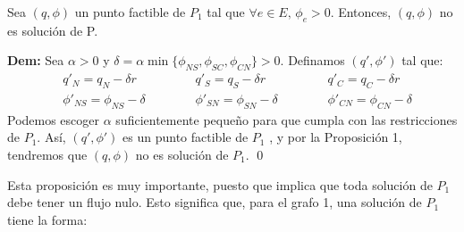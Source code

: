 \documentclass[12pt,twoside]{article}
\newenvironment{proposicion}[2][\(\blacksquare\) Proposici\'on]{\begin{trivlist}
		\item[\hskip \labelsep {\bfseries #1}\hskip \labelsep {\bfseries #2.}]}{\end{trivlist}}
\begin{document}
	\begin{proposicion}{3} Sea \((q,\phi)\) un punto factible de \(P_1\) tal que \(\forall e \in E,\, \phi_e>0\). Entonces, \((q,\phi)\) no es soluci\'on de P.
		
		\textbf{Dem:} Sea \(\alpha>0\) y \(\delta=\alpha\min\{\phi_{NS},\phi_{SC},\phi_{CN}\}>0\). Definamos \((q',\phi')\) tal que:
		\begin{equation*}
			\begin{aligned}
				&  q'_N=q_N-\delta r  & \hspace{1cm} &  q'_S=q_S-\delta r & \hspace{1cm} &  q'_C=q_C-\delta r \\
				& \phi'_{NS}=\phi_{NS}-\delta & \hspace{1cm} & \phi'_{SN}=\phi_{SN}-\delta & \hspace{1cm} & \phi'_{CN}=\phi_{CN}-\delta
			\end{aligned}
		\end{equation*}
		Podemos escoger \(\alpha\) suficientemente peque\~{n}o para que cumpla con las restricciones de \(P_1\). As\'i, \((q',\phi')\) es un punto factible de \(P_1\) , y por la Proposici\'on 1, tendremos que \((q,\phi)\) no es soluci\'on de \(P_1\). \qed
	\end{proposicion}
	
	\hspace{1cm}Esta proposici\'on es muy importante, puesto que implica que toda soluci\'on de \(P_1\) debe tener un flujo nulo. Esto significa que, para el grafo 1, una soluci\'on de \(P_1\) tiene la forma:
	
	\vspace{0.4cm}
	\begin{center}
	\end{center}
	
\end{document}
